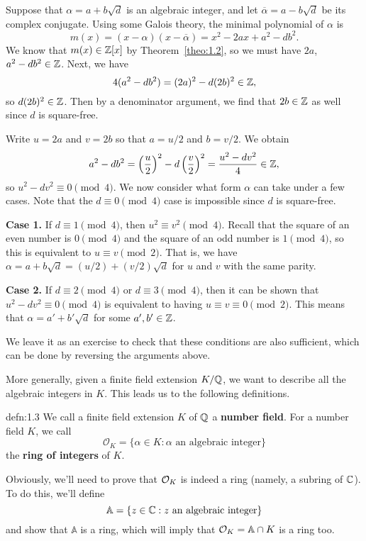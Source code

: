 Suppose that $\alpha = a + b\sqrt{d}$ is an algebraic integer, and let 
$\overline\alpha = a - b\sqrt{d}$ be its complex conjugate. Using some 
Galois theory, the minimal polynomial of $\alpha$ is 
\[ m(x) = (x - \alpha)(x - \overline\alpha) = x^2 - 2ax + a^2 - db^2. \] 
We know that $m(x) \in \mathbb{Z}[x]$ by Theorem~\ref{theo:1.2}, so we must have 
$2a$, $a^2 - db^2 \in \mathbb{Z}$. Next, we have 
\[ 4(a^2 - db^2) = (2a)^2 - d(2b)^2 \in \mathbb{Z}, \] 
so $d(2b)^2 \in \mathbb{Z}$. Then by a denominator argument, we find that 
$2b \in \mathbb{Z}$ as well since $d$ is square-free.

Write $u = 2a$ and $v = 2b$ so that $a = u/2$ and $b = v/2$. We obtain 
\[ a^2 - db^2 = \left(\frac{u}{2}\right)^2 - d\left(\frac{v}{2}\right)^2 
= \frac{u^2 - dv^2}{4} \in \mathbb{Z}, \] 
so $u^2 - dv^2 \equiv 0 \pmod 4$. We now consider what form $\alpha$ 
can take under a few cases. Note that the $d \equiv 0 \pmod 4$ case is 
impossible since $d$ is square-free. 

\textbf{Case 1.} If $d \equiv 1 \pmod 4$, then $u^2 \equiv v^2 \pmod 4$. 
Recall that the square of an even number is $0 \pmod 4$ and the square 
of an odd number is $1 \pmod 4$, so this is equivalent to $u \equiv v \pmod 2$. 
That is, we have $\alpha = a + b\sqrt{d} = (u/2) + (v/2)\sqrt{d}$ for $u$ 
and $v$ with the same parity.

\textbf{Case 2.} If $d \equiv 2 \pmod 4$ or $d \equiv 3 \pmod 4$, then 
it can be shown that $u^2 - dv^2 \equiv 0 \pmod 4$ is equivalent to having 
$u \equiv v \equiv 0 \pmod 2$. This means that $\alpha = a' + b'\sqrt{d}$ for 
some $a', b' \in \mathbb{Z}$. 

We leave it as an exercise to check that these conditions are also sufficient, 
which can be done by reversing the arguments above.

More generally, given a finite field extension $K/\mathbb{Q}$, we want to describe 
all the algebraic integers in $K$. This leads us to the following definitions.

\begin{defn}{defn:1.3}
    We call a finite field extension $K$ of $\mathbb{Q}$ a {\bf number field}.
    For a number field $K$, we call 
    \[ \mathcal{O}_K = \{\alpha \in K : \alpha \text{ an algebraic integer}\} \] 
    the {\bf ring of integers} of $K$.
\end{defn}

Obviously, we'll need to prove that ${\cal O}_K$ is indeed a ring (namely, 
a subring of $\mathbb{C}$). To do this, we'll define 
\[ \mathbb{A} = \{z \in \mathbb{C} : z \text{ an algebraic integer}\} \] 
and show that $\mathbb{A}$ is a ring, which will imply that ${\cal O}_K 
= \mathbb{A} \cap K$ is a ring too. 


